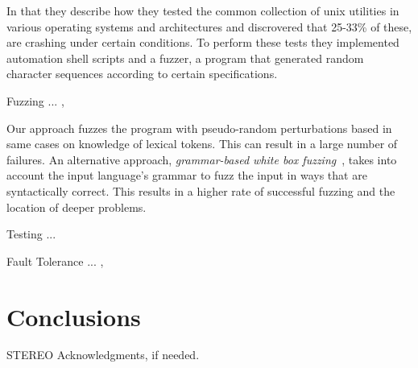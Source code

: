 \documentclass[10pt]{sigplanconf}
\begin{document}
In that they describe how they tested the common collection of {\sc unix}
utilities in various operating systems and architectures and discrovered that
25-33\% of these, are crashing under certain conditions. To perform these tests
they implemented automation shell scripts and a fuzzer, a program that generated
random character sequences according to certain specifications.

Fuzzing ... \cite{TJC08}, \cite{WWGZ11}

Our approach fuzzes the program with pseudo-random
perturbations based in same cases on knowledge of
lexical tokens.
This can result in a large number of failures.
An alternative approach, {\em grammar-based white box fuzzing}~\cite{God08},
takes into account the input language's grammar to fuzz the input in
ways that are syntactically correct.
This results in a higher rate of successful fuzzing and the location
of deeper problems.

Testing ... \cite{HAM06}

Fault Tolerance ... \cite{KOKR07}, \cite{LYU95}

\section{Conclusions} %
\label{sec:conclusions}


\acks

STEREO
Acknowledgments, if needed.








\end{document}
